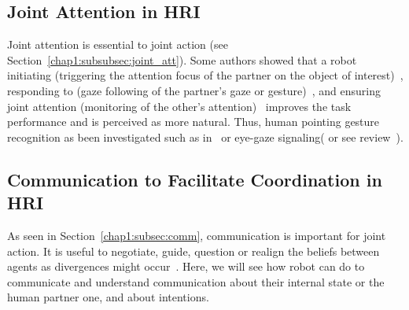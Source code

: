\documentclass[a4paper,11pt,twoside]{StyleThese}
\begin{document}
\subsection{Joint Attention in HRI}
Joint attention is essential to joint action (see Section~\ref{chap1:subsubsec:joint_att}). Some authors showed that a robot initiating (\ie triggering the attention focus of the partner on the object of interest)~\cite{imai_2003_physical}, responding to (\ie gaze following of the partner's gaze or gesture)~\cite{yu_2010_investigating}, and ensuring joint attention (\ie monitoring of the other's attention)~\cite{huang_2010_joint} improves the task performance and is perceived as more natural. Thus, human pointing gesture recognition as been investigated such as in~\cite{nickel_2007_visual} or eye-gaze signaling(\eg \cite{staudte_2009_visual} or see review~\cite{admoni_2017_social}).

\subsection{Communication to Facilitate Coordination in HRI}

As seen in Section~\ref{chap1:subsec:comm}, communication is important for joint action. It is useful to negotiate, guide, question or realign the beliefs between agents as divergences might occur~\cite{cohen_1991_teamwork}. Here, we will see how robot can do to communicate and understand communication about their internal state or the human partner one, and about intentions.
\end{document}
